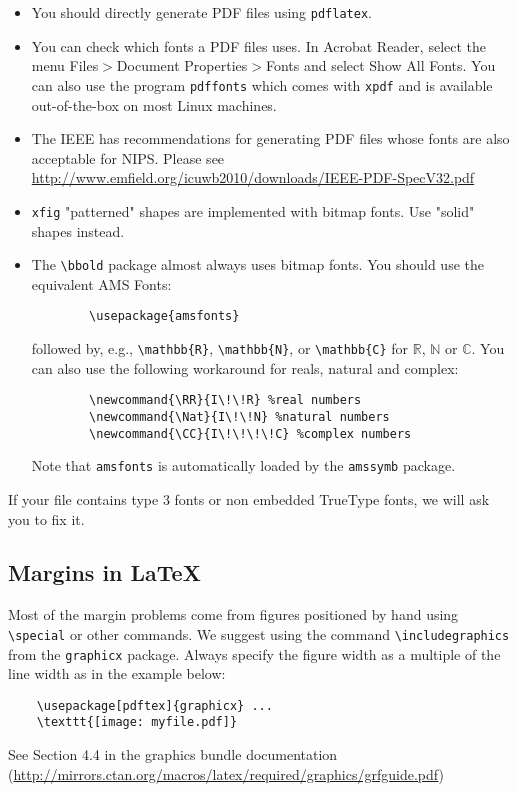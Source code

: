 \documentclass{article}
\begin{document}
	\begin{itemize}
		
		\item You should directly generate PDF files using \verb+pdflatex+.
		
		\item You can check which fonts a PDF files uses.  In Acrobat Reader,
		select the menu Files$>$Document Properties$>$Fonts and select Show
		All Fonts. You can also use the program \verb+pdffonts+ which comes
		with \verb+xpdf+ and is available out-of-the-box on most Linux
		machines.
		
		\item The IEEE has recommendations for generating PDF files whose
		fonts are also acceptable for NIPS. Please see
		\url{http://www.emfield.org/icuwb2010/downloads/IEEE-PDF-SpecV32.pdf}
		
		\item \verb+xfig+ "patterned" shapes are implemented with bitmap
		fonts.  Use "solid" shapes instead.
		
		\item The \verb+\bbold+ package almost always uses bitmap fonts.  You
		should use the equivalent AMS Fonts:
		\begin{verbatim}
		\usepackage{amsfonts}
		\end{verbatim}
		followed by, e.g., \verb+\mathbb{R}+, \verb+\mathbb{N}+, or
		\verb+\mathbb{C}+ for $\mathbb{R}$, $\mathbb{N}$ or $\mathbb{C}$.  You
		can also use the following workaround for reals, natural and complex:
		\begin{verbatim}
		\newcommand{\RR}{I\!\!R} %real numbers
		\newcommand{\Nat}{I\!\!N} %natural numbers
		\newcommand{\CC}{I\!\!\!\!C} %complex numbers
		\end{verbatim}
		Note that \verb+amsfonts+ is automatically loaded by the
		\verb+amssymb+ package.
		
	\end{itemize}
	
	If your file contains type 3 fonts or non embedded TrueType fonts, we
	will ask you to fix it.
	
	\subsection{Margins in \LaTeX{}}
	
	Most of the margin problems come from figures positioned by hand using
	\verb+\special+ or other commands. We suggest using the command
	\verb+\includegraphics+ from the \verb+graphicx+ package. Always
	specify the figure width as a multiple of the line width as in the
	example below:
	\begin{verbatim}
	\usepackage[pdftex]{graphicx} ...
	\texttt{[image: myfile.pdf]}
	\end{verbatim}
	See Section 4.4 in the graphics bundle documentation
	(\url{http://mirrors.ctan.org/macros/latex/required/graphics/grfguide.pdf})
	
\end{document}
